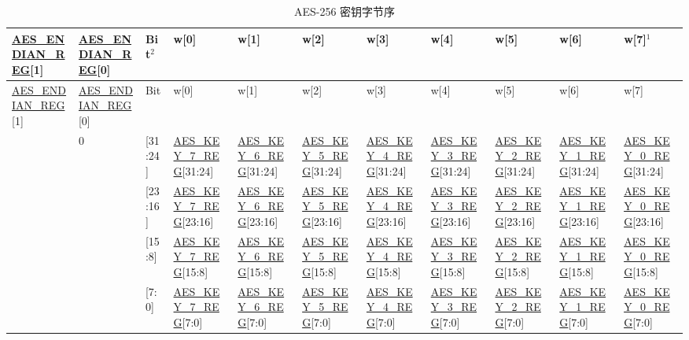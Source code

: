 \documentclass[main\_\_CN.tex]{subfiles}
\begin{document}
\begin{landscape}
\begin{tiny}
\begin{longtable}[c]
{ |p{1.5cm}|p{1.5cm}|p{0.5cm}|p{1.8cm}|p{1.8cm}|p{1.8cm}|p{1.8cm}|p{1.8cm}|p{1.8cm}|p{1.8cm}|p{1.8cm}|}
\caption{AES-256 密钥字节序}\label{table:AES256KeyEndian}\\
\hline
\rowcolor{lightgray}
\hyperref[regdesc:AESENDIANREG]{AES\_ENDIAN\_REG}[1]	&	\hyperref[regdesc:AESENDIANREG]{AES\_ENDIAN\_REG}[0]	&	Bit$^2$	&	w[0]	&	w[1]	&	w[2] 	&	w[3] 	&	w[4] 	&	w[5]&	w[6] 	&	w[7]$^1$	\\\hline
\endfirsthead
\hline
\rowcolor{lightgray}
\hyperref[regdesc:AESENDIANREG]{AES\_ENDIAN\_REG}[1]	&	\hyperref[regdesc:AESENDIANREG]{AES\_ENDIAN\_REG}[0]	&	Bit	&	w[0]	&	w[1]	&	w[2] 	&	w[3] 	&	w[4] 	&	w[5]&	w[6] 	&	w[7]	\\\hline
\endhead
\endfoot
\multirow{4}{4cm}{0} 	&	\multirow{4}{4cm}{0}	&	[31:24] 	&	\hyperref[regdesc:AESKEYnREG]{AES\_KEY\_7\_REG}[31:24]	&	\hyperref[regdesc:AESKEYnREG]{AES\_KEY\_6\_REG}[31:24] 	& \hyperref[regdesc:AESKEYnREG]{AES\_KEY\_5\_REG}[31:24]	&	\hyperref[regdesc:AESKEYnREG]{AES\_KEY\_4\_REG}[31:24] 	&	\hyperref[regdesc:AESKEYnREG]{AES\_KEY\_3\_REG}[31:24]	&	\hyperref[regdesc:AESKEYnREG]{AES\_KEY\_2\_REG}[31:24]	& \hyperref[regdesc:AESKEYnREG]{AES\_KEY\_1\_REG}[31:24]	&	\hyperref[regdesc:AESKEYnREG]{AES\_KEY\_0\_REG}[31:24]\\
\cline{3-11}
&&	[23:16] 	&\hyperref[regdesc:AESKEYnREG]{AES\_KEY\_7\_REG}[23:16]	&	\hyperref[regdesc:AESKEYnREG]{AES\_KEY\_6\_REG}[23:16] 	&	\hyperref[regdesc:AESKEYnREG]{AES\_KEY\_5\_REG}[23:16]	&	\hyperref[regdesc:AESKEYnREG]{AES\_KEY\_4\_REG}[23:16] 	&	\hyperref[regdesc:AESKEYnREG]{AES\_KEY\_3\_REG}[23:16]	&	\hyperref[regdesc:AESKEYnREG]{AES\_KEY\_2\_REG}[23:16] 	&	\hyperref[regdesc:AESKEYnREG]{AES\_KEY\_1\_REG}[23:16]	&	\hyperref[regdesc:AESKEYnREG]{AES\_KEY\_0\_REG}[23:16]\\
\cline{3-11}
&&	[15:8]	&	\hyperref[regdesc:AESKEYnREG]{AES\_KEY\_7\_REG}[15:8]	&	\hyperref[regdesc:AESKEYnREG]{AES\_KEY\_6\_REG}[15:8]	&\hyperref[regdesc:AESKEYnREG]{AES\_KEY\_5\_REG}[15:8]	&	\hyperref[regdesc:AESKEYnREG]{AES\_KEY\_4\_REG}[15:8]	&	\hyperref[regdesc:AESKEYnREG]{AES\_KEY\_3\_REG}[15:8]	&	\hyperref[regdesc:AESKEYnREG]{AES\_KEY\_2\_REG}[15:8] 	&	\hyperref[regdesc:AESKEYnREG]{AES\_KEY\_1\_REG}[15:8]	&	\hyperref[regdesc:AESKEYnREG]{AES\_KEY\_0\_REG}[15:8]\\
\cline{3-11}
&&	[7:0]	&	\hyperref[regdesc:AESKEYnREG]{AES\_KEY\_7\_REG}[7:0]	&	\hyperref[regdesc:AESKEYnREG]{AES\_KEY\_6\_REG}[7:0]	&\hyperref[regdesc:AESKEYnREG]{AES\_KEY\_5\_REG}[7:0]	&	\hyperref[regdesc:AESKEYnREG]{AES\_KEY\_4\_REG}[7:0]	&	\hyperref[regdesc:AESKEYnREG]{AES\_KEY\_3\_REG}[7:0]	&	\hyperref[regdesc:AESKEYnREG]{AES\_KEY\_2\_REG}[7:0] 	&	\hyperref[regdesc:AESKEYnREG]{AES\_KEY\_1\_REG}[7:0]	&	\hyperref[regdesc:AESKEYnREG]{AES\_KEY\_0\_REG}[7:0]\\

\end{longtable}
\end{tiny}
\end{landscape}
\end{document}
